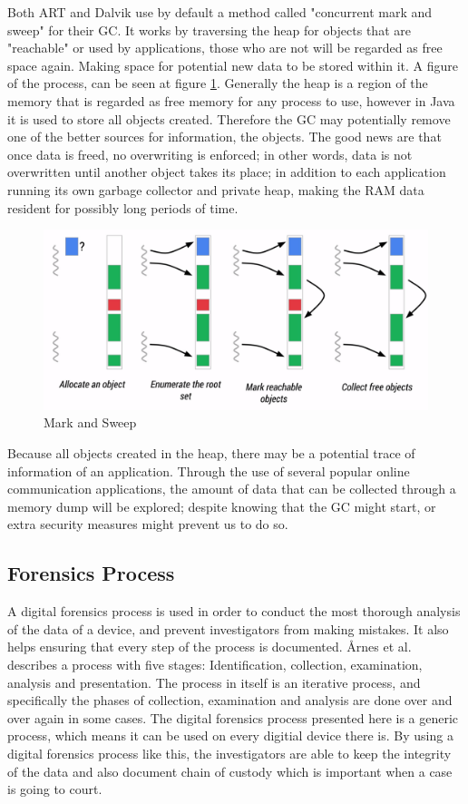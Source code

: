 Both ART and Dalvik use by default a method called "concurrent mark and sweep" for their GC\cite{ARTGC,DALVIKGC}. It works by traversing the heap for objects that are "reachable" or used by applications, those who are not will be regarded as free space again. Making space for potential new data to be stored within it. A figure of the process, can be seen at figure \ref{fig:mas}. Generally the heap is a region of the memory that is regarded as free memory for any process to use, however in Java it is used to store all objects created. Therefore the GC may potentially remove one of the better sources for information, the objects. The good news are that once data is freed, no overwriting is enforced; in other words, data is not overwritten until another object takes its place\cite{DALVIKGC}; in addition to each application running its own garbage collector and private heap, making the RAM data resident for possibly long periods of time\cite{AndroidMemManagement}.

\begin{figure}[h]
  \includegraphics[width=0.5 \textwidth]{gc}
  \caption{Mark and Sweep\cite{ARTGC}}
  \label{fig:mas}
\end{figure}

Because all objects created in the heap, there may be a potential trace of information of an application. Through the use of several popular online communication applications, the amount of data that can be collected through a memory dump will be explored; despite knowing that the GC might start, or extra security measures might prevent us to do so.

\subsection{Forensics Process}
A digital forensics process is used in order to conduct the most thorough analysis of the data of a device, and prevent investigators from making mistakes. It also helps ensuring that every step of the process is documented. \r{A}rnes et al. describes a process with five stages: Identification, collection, examination, analysis and presentation\cite{DiFoBook}. The process in itself is an iterative process, and specifically the phases of collection, examination and analysis are done over and over again in some cases. The digital forensics process presented here is a generic process, which means it can be used on every digitial device there is. By using a digital forensics process like this, the investigators are able to keep the integrity of the data and also document chain of custody which is important when a case is going to court. \\

